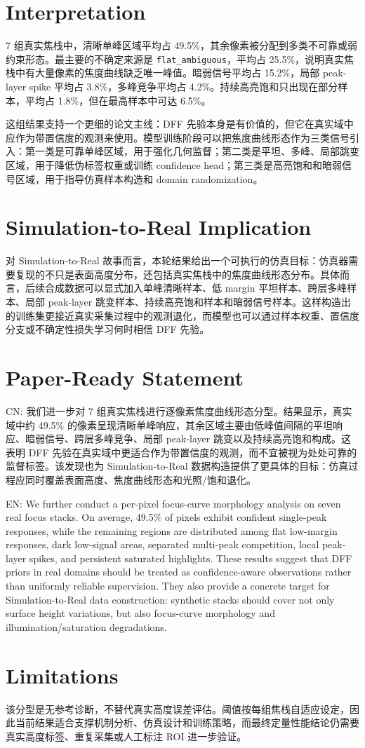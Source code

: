 \documentclass[11pt]{article}
\begin{document}
\section{Interpretation}

7 组真实焦栈中，清晰单峰区域平均占 49.5\%，其余像素被分配到多类不可靠或弱约束形态。最主要的不确定来源是 \texttt{flat\_ambiguous}，平均占 25.5\%，说明真实焦栈中有大量像素的焦度曲线缺乏唯一峰值。暗弱信号平均占 15.2\%，局部 peak-layer spike 平均占 3.8\%，多峰竞争平均占 4.2\%。持续高亮饱和只出现在部分样本，平均占 1.8\%，但在最高样本中可达 6.5\%。

这组结果支持一个更细的论文主线：DFF 先验本身是有价值的，但它在真实域中应作为带置信度的观测来使用。模型训练阶段可以把焦度曲线形态作为三类信号引入：第一类是可靠单峰区域，用于强化几何监督；第二类是平坦、多峰、局部跳变区域，用于降低伪标签权重或训练 confidence head；第三类是高亮饱和和暗弱信号区域，用于指导仿真样本构造和 domain randomization。

\section{Simulation-to-Real Implication}

对 Simulation-to-Real 故事而言，本轮结果给出一个可执行的仿真目标：仿真器需要复现的不只是表面高度分布，还包括真实焦栈中的焦度曲线形态分布。具体而言，后续合成数据可以显式加入单峰清晰样本、低 margin 平坦样本、跨层多峰样本、局部 peak-layer 跳变样本、持续高亮饱和样本和暗弱信号样本。这样构造出的训练集更接近真实采集过程中的观测退化，而模型也可以通过样本权重、置信度分支或不确定性损失学习何时相信 DFF 先验。

\section{Paper-Ready Statement}

CN: 我们进一步对 7 组真实焦栈进行逐像素焦度曲线形态分型。结果显示，真实域中约 49.5\% 的像素呈现清晰单峰响应，其余区域主要由低峰值间隔的平坦响应、暗弱信号、跨层多峰竞争、局部 peak-layer 跳变以及持续高亮饱和构成。这表明 DFF 先验在真实域中更适合作为带置信度的观测，而不宜被视为处处可靠的监督标签。该发现也为 Simulation-to-Real 数据构造提供了更具体的目标：仿真过程应同时覆盖表面高度、焦度曲线形态和光照/饱和退化。

EN: We further conduct a per-pixel focus-curve morphology analysis on seven real focus stacks. On average, 49.5\% of pixels exhibit confident single-peak responses, while the remaining regions are distributed among flat low-margin responses, dark low-signal areas, separated multi-peak competition, local peak-layer spikes, and persistent saturated highlights. These results suggest that DFF priors in real domains should be treated as confidence-aware observations rather than uniformly reliable supervision. They also provide a concrete target for Simulation-to-Real data construction: synthetic stacks should cover not only surface height variations, but also focus-curve morphology and illumination/saturation degradations.

\section{Limitations}

该分型是无参考诊断，不替代真实高度误差评估。阈值按每组焦栈自适应设定，因此当前结果适合支撑机制分析、仿真设计和训练策略，而最终定量性能结论仍需要真实高度标签、重复采集或人工标注 ROI 进一步验证。
\end{document}
